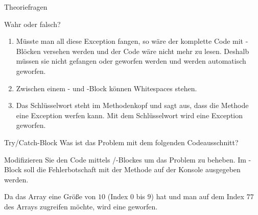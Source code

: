 \documentclass{../tuda-exercise}
\begin{document}
\begin{task}[credit=\stars{0}{3}]{Theoriefragen}
\begin{subtask*}{Wahr oder falsch?}
\begin{solution}
\begin{enumerate}
          In anderen Worten: Die -Blöcke werden von oben nach unten
          durchlaufen, bis einer passt, d.h. wenn der dynamische Typ des geworfenen
          Exception-Objekts gleich oder Subtyp des statischen Typs im
          -Block ist.
          \item Müsste man all diese Exception fangen, so wäre der komplette Code mit
          -Blöcken versehen werden und der Code wäre nicht mehr zu lesen. Deshalb
          müssen sie nicht gefangen oder geworfen werden und werden automatisch geworfen.
          \item Zwischen einem - und -Block können Whitespaces
          stehen.
          \item Das Schlüsselwort  steht im Methodenkopf und sagt aus, dass
          die Methode eine Exception werfen kann. Mit dem Schlüsselwort  wird
          eine Exception geworfen.
        \end{enumerate}
      \end{solution}
    \end{subtask*}
  \end{task}

  \begin{task}[credit=\stars{1}{3}]{Try/Catch-Block}
    Was ist das Problem mit dem folgenden Codeausschnitt?

    

    Modifizieren Sie den Code mittels /-Blockes um das Problem
    zu beheben. Im
    -Block soll die Fehlerbotschaft mit der Methode  auf der Konsole ausgegeben werden.

    \begin{solution}
      Da das Array eine Größe von \(10\) (Index \(0\) bis \(9\)) hat und man auf dem Index \(77\)
      des Arrays zugreifen möchte, wird eine  geworfen.

      
    \end{solution}
  \end{task}

  \clearpagesolution
\end{document}
